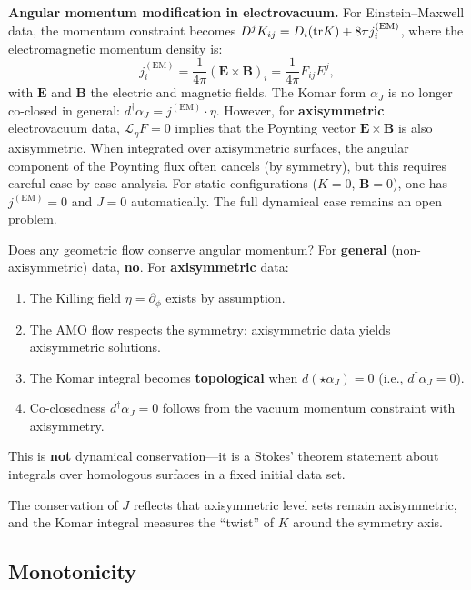 \begin{remark}
\textbf{Angular momentum modification in electrovacuum.} For Einstein--Maxwell data, the momentum constraint becomes $D^j K_{ij} = D_i(\mathrm{tr} K) + 8\pi j_i^{(\mathrm{EM})}$, where the electromagnetic momentum density is:
\[
j_i^{(\mathrm{EM})} = \frac{1}{4\pi}(\mathbf{E} \times \mathbf{B})_i = \frac{1}{4\pi}F_{ij}E^j,
\]
with $\mathbf{E}$ and $\mathbf{B}$ the electric and magnetic fields. The Komar form $\alpha_J$ is no longer co-closed in general: $d^\dagger\alpha_J = j^{(\mathrm{EM})} \cdot \eta$. However, for \textbf{axisymmetric} electrovacuum data, $\mathcal{L}_\eta F = 0$ implies that the Poynting vector $\mathbf{E} \times \mathbf{B}$ is also axisymmetric. When integrated over axisymmetric surfaces, the angular component of the Poynting flux often cancels (by symmetry), but this requires careful case-by-case analysis. For static configurations ($K = 0$, $\mathbf{B} = 0$), one has $j^{(\mathrm{EM})} = 0$ and $J = 0$ automatically. The full dynamical case remains an open problem.
\end{remark}

\begin{remark}
Does any geometric flow conserve angular momentum? For \textbf{general} (non-axisymmetric) data, \textbf{no}. For \textbf{axisymmetric} data:
\begin{enumerate}
    \item The Killing field $\eta = \partial_\phi$ exists by assumption.
    \item The AMO flow respects the symmetry: axisymmetric data yields axisymmetric solutions.
    \item The Komar integral becomes \textbf{topological} when $d(\star\alpha_J) = 0$ (i.e., $d^\dagger\alpha_J = 0$).
    \item Co-closedness $d^\dagger\alpha_J = 0$ follows from the vacuum momentum constraint with axisymmetry.
\end{enumerate}
This is \textbf{not} dynamical conservation---it is a Stokes' theorem statement about integrals over homologous surfaces in a fixed initial data set.
\end{remark}

\begin{remark}
The conservation of $J$ reflects that axisymmetric level sets remain axisymmetric, and the Komar integral measures the ``twist'' of $K$ around the symmetry axis.
\end{remark}

\subsection{Monotonicity}

